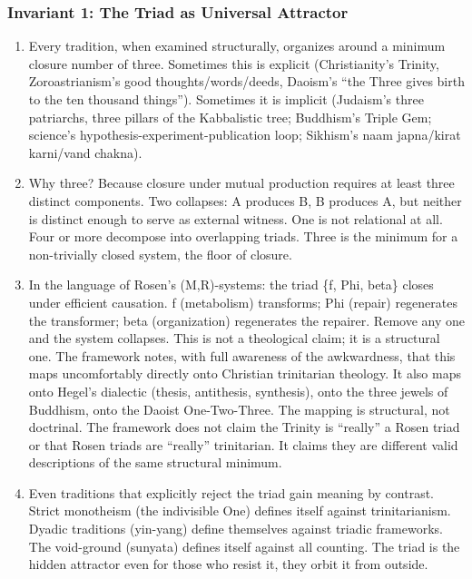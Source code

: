 \documentclass[
]{article}
\begin{document}
\subsubsection{Invariant 1: The Triad as Universal
Attractor}\label{invariant-1-the-triad-as-universal-attractor}

\begin{enumerate}
\def\labelenumi{\arabic{enumi}.}
\setcounter{enumi}{162}
\item
  Every tradition, when examined structurally, organizes around a
  minimum closure number of three. Sometimes this is explicit
  (Christianity's Trinity, Zoroastrianism's good thoughts/words/deeds,
  Daoism's ``the Three gives birth to the ten thousand things'').
  Sometimes it is implicit (Judaism's three patriarchs, three pillars of
  the Kabbalistic tree; Buddhism's Triple Gem; science's
  hypothesis-experiment-publication loop; Sikhism's naam japna/kirat
  karni/vand chakna).
\item
  Why three? Because closure under mutual production requires at least
  three distinct components. Two collapses: A produces B, B produces A,
  but neither is distinct enough to serve as external witness. One is
  not relational at all. Four or more decompose into overlapping triads.
  Three is the minimum for a non-trivially closed system, the floor of
  closure.
\item
  In the language of Rosen's (M,R)-systems: the triad \{f, Phi, beta\}
  closes under efficient causation. f (metabolism) transforms; Phi
  (repair) regenerates the transformer; beta (organization) regenerates
  the repairer. Remove any one and the system collapses. This is not a
  theological claim; it is a structural one. The framework notes, with
  full awareness of the awkwardness, that this maps uncomfortably
  directly onto Christian trinitarian theology. It also maps onto
  Hegel's dialectic (thesis, antithesis, synthesis), onto the three
  jewels of Buddhism, onto the Daoist One-Two-Three. The mapping is
  structural, not doctrinal. The framework does not claim the Trinity is
  ``really'' a Rosen triad or that Rosen triads are ``really''
  trinitarian. It claims they are different valid descriptions of the
  same structural minimum.
\item
  Even traditions that explicitly reject the triad gain meaning by
  contrast. Strict monotheism (the indivisible One) defines itself
  against trinitarianism. Dyadic traditions (yin-yang) define themselves
  against triadic frameworks. The void-ground (sunyata) defines itself
  against all counting. The triad is the hidden attractor even for those
  who resist it, they orbit it from outside.
\end{enumerate}
\end{document}
